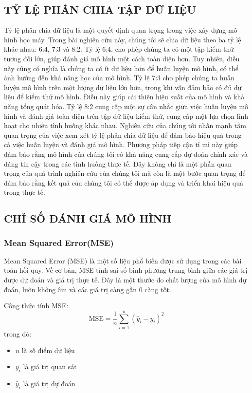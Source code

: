 \documentclass{article}
\begin{document}
\begin{multicols}{2}
\subsection{TỶ LỆ PHÂN CHIA TẬP DỮ LIỆU}
 Tỷ lệ phân chia dữ liệu là một quyết định quan trọng trong việc xây dựng mô hình học máy. Trong bài nghiên cứu này, chúng tôi sẽ chia dữ liệu theo ba tỷ lệ khác nhau: 6:4, 7:3 và 8:2.
 Tỷ lệ 6:4, cho phép chúng ta có một tập kiểm thử tương đối lớn, giúp đánh giá mô hình một cách toàn diện hơn. Tuy nhiên, điều này cũng có nghĩa là chúng ta có ít dữ liệu hơn để huấn luyện mô hình, có thể ảnh hưởng đến khả năng học của mô hình.
 Tỷ lệ 7:3 cho phép chúng ta huấn luyện mô hình trên một lượng dữ liệu lớn hơn, trong khi vẫn đảm bảo có đủ dữ liệu để kiểm thử mô hình. Điều này giúp cải thiện hiệu suất của mô hình và khả năng tổng quát hóa.
 Tỷ lệ 8:2 cung cấp một sự cân nhắc giữa việc huấn luyện mô hình và đánh giá toàn diện trên tập dữ liệu kiểm thử, cung cấp một lựa chọn linh hoạt cho nhiều tình huống khác nhau.
 Nghiên cứu của chúng tôi nhấn mạnh tầm quan trọng của việc xem xét tỷ lệ phân chia dữ liệu để đảm bảo hiệu quả trong cả việc huấn luyện và đánh giá mô hình. Phương pháp tiếp cận tỉ mỉ này giúp đảm bảo rằng mô hình của chúng tôi có khả năng cung 
 cấp dự đoán chính xác và đáng tin cậy trong các tình huống thực tế. Đây không chỉ là một phần quan trọng của quá trình nghiên cứu của chúng tôi mà còn là một bước quan trọng để đảm bảo rằng kết quả của chúng tôi có thể được áp dụng và triển khai hiệu quả trong thực tế.

\subsection{CHỈ SỐ ĐÁNH GIÁ MÔ HÌNH}
\subsubsection{Mean Squared Error(MSE)}


Mean Squared Error (MSE) là một số liệu phổ biến được sử dụng trong các bài toán hồi quy. Về cơ bản, MSE tính sai số bình phương trung bình giữa các giá trị được dự đoán và giá trị thực tế. Đây là một thước đo chất lượng của mô hình dự đoán, luôn không âm và các giá trị càng gần 0 càng tốt.

Công thức tính MSE:
\[
\text{MSE} = \frac{1}{n} \sum_{i=1}^{n} (\hat{y}_i - y_i)^2
\]
trong đó:
\begin{itemize}
    \item $n$ là số điểm dữ liệu
    \item $y_i$ là giá trị quan sát
    \item $\hat{y}_i$ là giá trị dự đoán
\end{itemize}


\end{multicols}
\end{document}
